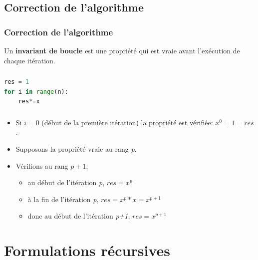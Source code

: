 \documentclass[svgnames,11pt]{beamer}
\begin{document}
\subsection{Correction de l'algorithme}
\begin{frame}
    \frametitle{Correction de l'algorithme}

    \begin{aretenir}[]
        Un \textbf{invariant de boucle} est une propriété qui est vraie avant l’exécution de chaque itération.
    \end{aretenir}

\end{frame}
\begin{frame}[fragile]
    \frametitle{}

    \begin{center}
    \begin{lstlisting}[language=Python , basicstyle=\ttfamily\small, xleftmargin=2em, xrightmargin=2em]
res = 1
for i in range(n):
    res*=x
\end{lstlisting}
    \label{CODE}
    \end{center}
\end{frame}
\begin{frame}
    \frametitle{}

    \begin{itemize}
        \item<1-> Si $i=0$ (début de la première itération) la propriété est vérifiée: $x^0=1=res$.
        \item<2-> Supposons la propriété vraie au rang \emph{p}.
        \item<3-> Vérifions au rang $p+1$:
        \begin{itemize}
            \item au début de l'itération \emph{p}, $res=x^p$
            \item à la fin de l'itération \emph{p}, $res=x^p*x=x^{p+1}$
            \item donc au début de l'itération \emph{p+1}, $res=x^{p+1}$
        \end{itemize}
    \end{itemize}

\end{frame}
\section{Formulations récursives}
\end{document}
